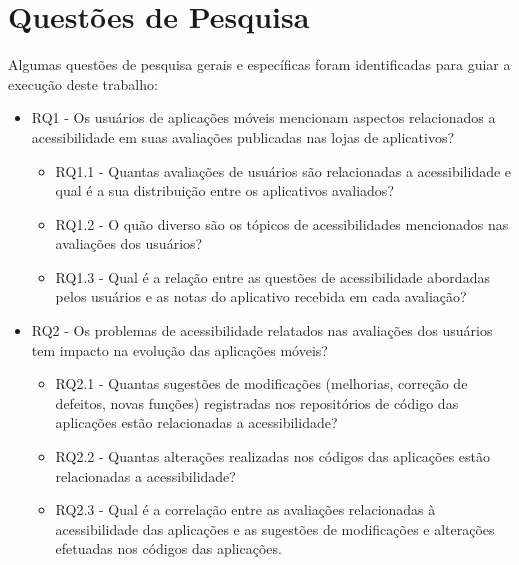 


\section{Questões de Pesquisa}
\label{sec:questoespesquisa}

Algumas questões de pesquisa gerais e específicas foram identificadas para guiar a execução deste trabalho:
\begin{itemize}
 \item RQ1 - Os usuários de aplicações móveis mencionam aspectos relacionados a acessibilidade em suas avaliações publicadas nas lojas de aplicativos?
    \begin{itemize}
       \item RQ1.1 - Quantas avaliações de usuários são relacionadas a acessibilidade e qual é a sua distribuição entre os aplicativos avaliados?
       \item RQ1.2 - O quão diverso são os tópicos de acessibilidades mencionados nas avaliações dos usuários?
        \item RQ1.3 - Qual é a relação entre as questões de acessibilidade abordadas pelos usuários e as notas do aplicativo recebida em cada avaliação?
 \end{itemize}
  \item RQ2 - Os problemas de acessibilidade relatados nas avaliações dos usuários tem impacto na evolução das aplicações móveis?
        \begin{itemize}
        \item RQ2.1 - Quantas sugestões de modificações (melhorias, correção de defeitos, novas funções) registradas nos repositórios de código das aplicações estão relacionadas a acessibilidade?
        \item RQ2.2 - Quantas alterações realizadas nos códigos das aplicações estão relacionadas a acessibilidade?
        \item RQ2.3 - Qual é a correlação entre as avaliações relacionadas à acessibilidade das aplicações e as sugestões de modificações e alterações efetuadas nos códigos das aplicações.
        \end{itemize}
\end{itemize}

